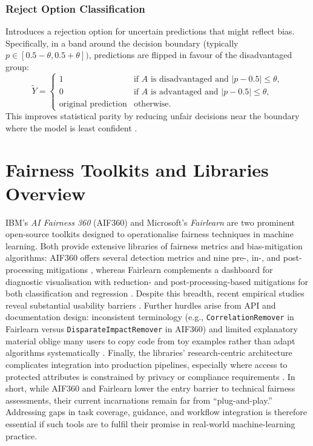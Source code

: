 \documentclass[12pt,a4paper,openright,twoside]{book}
\begin{document}
\subsubsection{Reject Option Classification} Introduces a rejection option for uncertain predictions that might reflect bias. Specifically, in a band around the decision boundary (typically \begin{math} p \in [0.5 - \theta, 0.5 + \theta]) \end{math}, predictions are flipped in favour of the disadvantaged group:
\begin{equation}
    \widetilde{Y} =
        \begin{cases}
        1 & \text{if } A \text{ is disadvantaged and } |p - 0.5| \le \theta, \\
        0 & \text{if } A \text{ is advantaged and } |p - 0.5| \le \theta, \\
        \text{original prediction} & \text{otherwise.}
        \end{cases}
\end{equation}
This improves statistical parity by reducing unfair decisions near the boundary where the model is least confident \cite{6413831}.

\section{Fairness Toolkits and Libraries Overview}
IBM’s \textit{AI Fairness 360} (AIF360) and Microsoft’s \textit{Fairlearn} are two prominent open-source toolkits designed to operationalise fairness techniques in machine learning. Both provide extensive libraries of fairness metrics and bias-mitigation algorithms: AIF360 offers several detection metrics and nine pre-, in-, and post-processing mitigations \cite{bellamy2019aif360}, whereas Fairlearn complements a dashboard for diagnostic visualisation with reduction- and post-processing-based mitigations for both classification and regression \cite{bird2020fairlearn}. Despite this breadth, recent empirical studies reveal substantial usability barriers \cite{deng2022exploring}. 
Further hurdles arise from API and documentation design: inconsistent terminology (e.g., \texttt{CorrelationRemover} in Fairlearn versus \texttt{DisparateImpactRemover} in AIF360) and limited explanatory material oblige many users to copy code from toy examples rather than adapt algorithms systematically \cite{deng2022exploring}. Finally, the libraries’ research-centric architecture complicates integration into production pipelines, especially where access to protected attributes is constrained by privacy or compliance requirements \cite{holstein2019}. In short, while AIF360 and Fairlearn lower the entry barrier to technical fairness assessments, their current incarnations remain far from “plug-and-play.” Addressing gaps in task coverage, guidance, and workflow integration is therefore essential if such tools are to fulfil their promise in real-world machine-learning practice.
\end{document}
